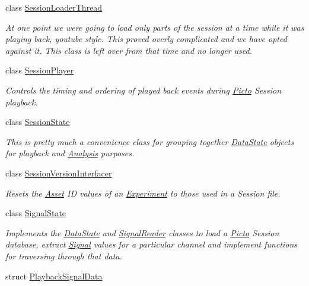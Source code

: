 \begin{DoxyCompactItemize}
class \hyperlink{class_picto_1_1_session_loader_thread}{Session\-Loader\-Thread}
\begin{DoxyCompactList}\small\item\em At one point we were going to load only parts of the session at a time while it was playing back, youtube style. This proved overly complicated and we have opted against it. This class is left over from that time and no longer used. \end{DoxyCompactList}\item 
class \hyperlink{class_picto_1_1_session_player}{Session\-Player}
\begin{DoxyCompactList}\small\item\em Controls the timing and ordering of played back events during \hyperlink{namespace_picto}{Picto} Session playback. \end{DoxyCompactList}\item 
class \hyperlink{class_picto_1_1_session_state}{Session\-State}
\begin{DoxyCompactList}\small\item\em This is pretty much a convenience class for grouping together \hyperlink{class_picto_1_1_data_state}{Data\-State} objects for playback and \hyperlink{class_picto_1_1_analysis}{Analysis} purposes. \end{DoxyCompactList}\item 
class \hyperlink{class_picto_1_1_session_version_interfacer}{Session\-Version\-Interfacer}
\begin{DoxyCompactList}\small\item\em Resets the \hyperlink{class_picto_1_1_asset}{Asset} I\-D values of an \hyperlink{class_picto_1_1_experiment}{Experiment} to those used in a Session file. \end{DoxyCompactList}\item 
class \hyperlink{class_picto_1_1_signal_state}{Signal\-State}
\begin{DoxyCompactList}\small\item\em Implements the \hyperlink{class_picto_1_1_data_state}{Data\-State} and \hyperlink{class_picto_1_1_signal_reader}{Signal\-Reader} classes to load a \hyperlink{namespace_picto}{Picto} Session database, extract \hyperlink{class_picto_1_1_signal}{Signal} values for a particular channel and implement functions for traversing through that data. \end{DoxyCompactList}\item 
struct \hyperlink{struct_picto_1_1_playback_signal_data}{Playback\-Signal\-Data}

\end{DoxyCompactItemize}
